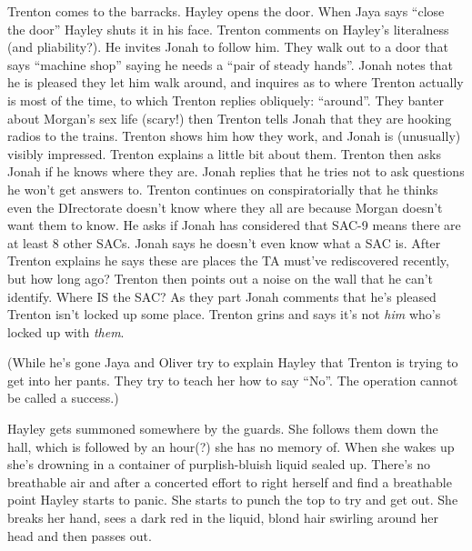 

Trenton comes to the barracks.  Hayley opens the door.  When Jaya says ``close the door'' Hayley shuts it in his face.  Trenton comments on Hayley's literalness (and pliability?).  He invites Jonah to follow him.  They walk out to a door that says ``machine shop'' saying he needs a ``pair of steady hands''.  Jonah notes that he is pleased they let him walk around, and inquires as to where Trenton actually is most of the time, to which Trenton replies obliquely: ``around''.  They banter about Morgan's sex life (scary!) then Trenton tells Jonah that they are hooking radios to the trains.  Trenton shows him how they work, and Jonah is (unusually) visibly impressed.  Trenton explains a little bit about them.  Trenton then asks Jonah if he knows where they are.  Jonah replies that he tries not to ask questions he won't get answers to.  Trenton continues on conspiratorially that he thinks even the DIrectorate doesn't know where they all are because Morgan doesn't want them to know.  He asks if Jonah has considered that SAC-9 means there are at least 8 other SACs.  Jonah says he doesn't even know what a SAC is.  After Trenton explains he says these are places the TA must've rediscovered recently, but how long ago? Trenton then points out a noise on the wall that he can't identify.  Where IS the SAC?  As they part Jonah comments that he's pleased Trenton isn't locked up some place.  Trenton grins and says it's not \textit{him} who's locked up with \textit{them}.



(While he's gone Jaya and Oliver try to explain Hayley that Trenton is trying to get into her pants.  They try to teach her how to say ``No''.  The operation cannot be called a success.)




Hayley gets summoned somewhere by the guards.   She follows them down the hall, which is  followed by an hour(?) she has no memory of.  When she wakes up she's drowning in a container of purplish-bluish liquid sealed up. There's no breathable air and after a concerted effort to right herself and find a breathable point Hayley starts to panic.  She starts to punch the top to try and get out.  She breaks her hand, sees a dark red in the liquid, blond hair swirling around her head and then passes out.



